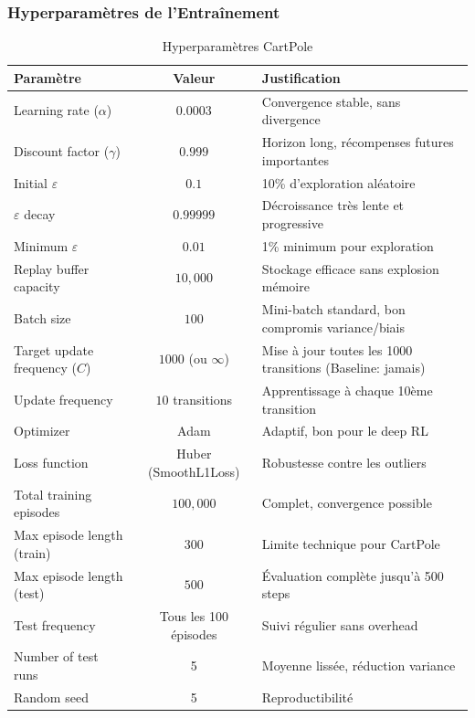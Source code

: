 \subsubsection{Hyperparamètres de l'Entraînement}

\begin{table}[h!]
    \centering
    \begin{tabular}{|l|c|l|}
    \hline
    \textbf{Paramètre} & \textbf{Valeur} & \textbf{Justification} \\
    \hline
    Learning rate ($\alpha$) & $0.0003$ & Convergence stable, sans divergence \\
    \hline
    Discount factor ($\gamma$) & $0.999$ & Horizon long, récompenses futures importantes \\
    \hline
    Initial $\varepsilon$ & $0.1$ & 10\% d'exploration aléatoire \\
    \hline
    $\varepsilon$ decay & $0.99999$ & Décroissance très lente et progressive \\
    \hline
    Minimum $\varepsilon$ & $0.01$ & 1\% minimum pour exploration \\
    \hline
    Replay buffer capacity & $10,000$ & Stockage efficace sans explosion mémoire \\
    \hline
    Batch size & $100$ & Mini-batch standard, bon compromis variance/biais \\
    \hline
    Target update frequency ($C$) & $1000$ (ou $\infty$) & Mise à jour toutes les 1000 transitions (Baseline: jamais) \\
    \hline
    Update frequency & $10$ transitions & Apprentissage à chaque 10ème transition \\
    \hline
    Optimizer & Adam & Adaptif, bon pour le deep RL \\
    \hline
    Loss function & Huber (SmoothL1Loss) & Robustesse contre les outliers \\
    \hline
    Total training episodes & $100,000$ & Complet, convergence possible \\
    \hline
    Max episode length (train) & $300$ & Limite technique pour CartPole \\
    \hline
    Max episode length (test) & $500$ & Évaluation complète jusqu'à 500 steps \\
    \hline
    Test frequency & Tous les 100 épisodes & Suivi régulier sans overhead \\
    \hline
    Number of test runs & 5 & Moyenne lissée, réduction variance \\
    \hline
    Random seed & 5 & Reproductibilité \\
    \hline
    \end{tabular}
    \caption{Hyperparamètres CartPole}
\end{table}

